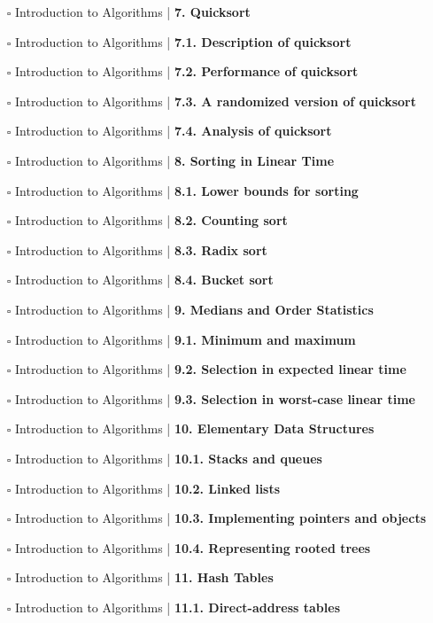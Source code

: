 \documentclass[a4, landscape, 12pt]{article}
\newcommand{\checkbox}{$\square$}%
\begin{document}
\begin{itemize}
{}
\item [\checkbox]  Introduction to Algorithms | \textbf{ 7. Quicksort
}
\item [\checkbox]  Introduction to Algorithms | \textbf{ 7.1. Description of quicksort
}
\item [\checkbox]  Introduction to Algorithms | \textbf{ 7.2. Performance of quicksort
}
\item [\checkbox]  Introduction to Algorithms | \textbf{ 7.3. A randomized version of quicksort
}
\item [\checkbox]  Introduction to Algorithms | \textbf{ 7.4. Analysis of quicksort
}
\item [\checkbox]  Introduction to Algorithms | \textbf{ 8. Sorting in Linear Time
}
\item [\checkbox]  Introduction to Algorithms | \textbf{ 8.1. Lower bounds for sorting
}
\item [\checkbox]  Introduction to Algorithms | \textbf{ 8.2. Counting sort
}
\item [\checkbox]  Introduction to Algorithms | \textbf{ 8.3. Radix sort
}
\item [\checkbox]  Introduction to Algorithms | \textbf{ 8.4. Bucket sort
}
\item [\checkbox]  Introduction to Algorithms | \textbf{ 9. Medians and Order Statistics
}
\item [\checkbox]  Introduction to Algorithms | \textbf{ 9.1. Minimum and maximum
}
\item [\checkbox]  Introduction to Algorithms | \textbf{ 9.2. Selection in expected linear time
}
\item [\checkbox]  Introduction to Algorithms | \textbf{ 9.3. Selection in worst-case linear time
}
\item [\checkbox]  Introduction to Algorithms | \textbf{ 10. Elementary Data Structures
}
\item [\checkbox]  Introduction to Algorithms | \textbf{ 10.1. Stacks and queues
}
\item [\checkbox]  Introduction to Algorithms | \textbf{ 10.2. Linked lists
}
\item [\checkbox]  Introduction to Algorithms | \textbf{ 10.3. Implementing pointers and objects
}
\item [\checkbox]  Introduction to Algorithms | \textbf{ 10.4. Representing rooted trees
}
\item [\checkbox]  Introduction to Algorithms | \textbf{ 11. Hash Tables
}
\item [\checkbox]  Introduction to Algorithms | \textbf{ 11.1. Direct-address tables
}
\end{itemize}
\end{document}

